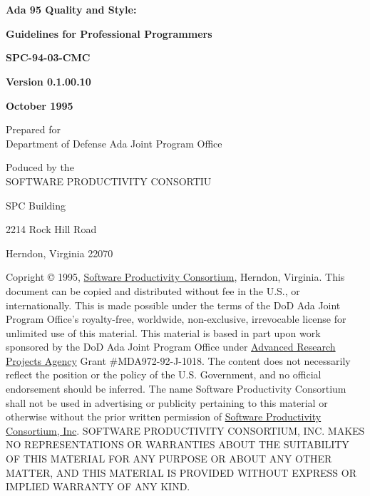 %
%
%

\chapter[英文原版的版权声明]{}
\pagestyle{empty}
\begin{center}
\textbf{\huge{Ada 95 Quality and Style:}}

\textbf{\large{Guidelines for Professional Programmers}}

\vfill
\textbf{\large{SPC-94-03-CMC}}

\vspace{2em}
\textbf{\large{Version 0.1.00.10}}

\vspace{2em}
\textbf{\large{October 1995}}

\vspace{2em}
\large{Prepared for\\
Department of Defense Ada Joint Program Office}

\vspace{2em}
Poduced by the\\
SOFTWARE PRODUCTIVITY CONSORTIU

\vspace{2em}
SPC Building

2214 Rock Hill Road

Herndon, Virginia 22070

\vspace{2em}

\end{center}

\vspace{2em}
\noindent
\footnotesize{
Copright \copyright{} 1995, \href{http://www.software.org}
{Software Productivity Consortium}, Herndon, Virginia.
This document can be copied and distributed without fee in the U.S., or
internationally. This is made possible under the terms of the DoD Ada Joint
Program Office's royalty-free, worldwide, non-exclusive, irrevocable license
for unlimited use of this material. This material is based in part upon work
sponsored by the DoD Ada Joint Program Office under
\href{http://www.arpa.mil/}{Advanced Research Projects
Agency} Grant \#MDA972-92-J-1018. The content does not necessarily reflect the position or the policy of the U.S. Government, and no official endorsement should
be inferred. The name Software Productivity Consortium shall not be used in
advertising or publicity pertaining to this material or otherwise without the
prior written permission of
\href{http://www.software.org}{Software Productivity Consortium, Inc}.
SOFTWARE PRODUCTIVITY CONSORTIUM, INC. MAKES NO REPRESENTATIONS OR WARRANTIES
ABOUT THE SUITABILITY OF THIS MATERIAL FOR ANY PURPOSE OR ABOUT ANY OTHER
MATTER, AND THIS MATERIAL IS PROVIDED WITHOUT EXPRESS OR IMPLIED WARRANTY OF
ANY KIND.}

